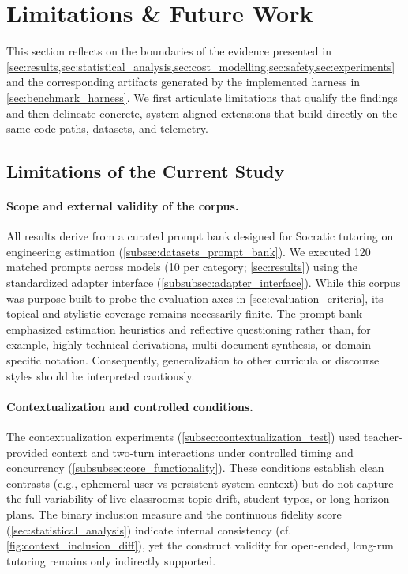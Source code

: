 \section{Limitations \& Future Work}
\label{sec:limitations}

This section reflects on the boundaries of the evidence presented in \cref{sec:results,sec:statistical_analysis,sec:cost_modelling,sec:safety,sec:experiments} and the corresponding artifacts generated by the implemented harness in \cref{sec:benchmark_harness}. We first articulate limitations that qualify the findings and then delineate concrete, system-aligned extensions that build directly on the same code paths, datasets, and telemetry.

\subsection{Limitations of the Current Study}
\label{subsec:limitations_study}

\paragraph{Scope and external validity of the corpus.} All results derive from a curated prompt bank designed for Socratic tutoring on engineering estimation (\cref{subsec:datasets_prompt_bank}). We executed 120 matched prompts across models (10 per category; \cref{sec:results}) using the standardized adapter interface (\cref{subsubsec:adapter_interface}). While this corpus was purpose-built to probe the evaluation axes in \cref{sec:evaluation_criteria}, its topical and stylistic coverage remains necessarily finite. The prompt bank emphasized estimation heuristics and reflective questioning rather than, for example, highly technical derivations, multi-document synthesis, or domain-specific notation. Consequently, generalization to other curricula or discourse styles should be interpreted cautiously.

\paragraph{Contextualization and controlled conditions.} The contextualization experiments (\cref{subsec:contextualization_test}) used teacher-provided context and two-turn interactions under controlled timing and concurrency (\cref{subsubsec:core_functionality}). These conditions establish clean contrasts (e.g., ephemeral user vs persistent system context) but do not capture the full variability of live classrooms: topic drift, student typos, or long-horizon plans. The binary inclusion measure and the continuous fidelity score (\cref{sec:statistical_analysis}) indicate internal consistency (cf. \cref{fig:context_inclusion_diff}), yet the construct validity for open-ended, long-run tutoring remains only indirectly supported.

